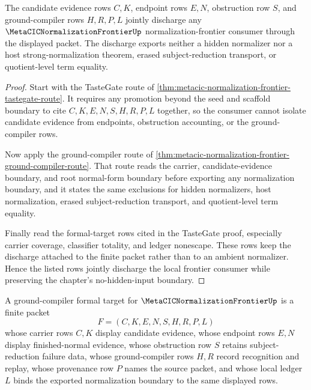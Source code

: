 \begin{theorem}
\label{thm:metacic-normalization-frontier-discharge-route}
The candidate evidence rows $C,K$, endpoint rows $E,N$, obstruction row $S$, and ground-compiler rows $H,R,P,L$ jointly discharge any $\MetaCICNormalizationFrontierUp$ normalization-frontier consumer through the displayed packet. The discharge exports neither a hidden normalizer nor a host strong-normalization theorem, erased subject-reduction transport, or quotient-level term equality.
\end{theorem}
\begin{proof}
Start with the TasteGate route of \autoref{thm:metacic-normalization-frontier-tastegate-route}. It requires any promotion beyond the seed and scaffold boundary to cite $C,K,E,N,S,H,R,P,L$ together, so the consumer cannot isolate candidate evidence from endpoints, obstruction accounting, or the ground-compiler rows.

Now apply the ground-compiler route of \autoref{thm:metacic-normalization-frontier-ground-compiler-route}. That route reads the carrier, candidate-evidence boundary, and root normal-form boundary before exporting any normalization boundary, and it states the same exclusions for hidden normalizers, host normalization, erased subject-reduction transport, and quotient-level term equality.

Finally read the formal-target rows cited in the TasteGate proof, especially carrier coverage, classifier totality, and ledger nonescape. These rows keep the discharge attached to the finite packet rather than to an ambient normalizer. Hence the listed rows jointly discharge the local frontier consumer while preserving the chapter's no-hidden-input boundary.
\end{proof}

\begin{definition}
\label{def:metacic-normalization-frontier-ground-compiler-formal-target}
A ground-compiler formal target for $\MetaCICNormalizationFrontierUp$ is a finite packet
$$
F=(C,K,E,N,S,H,R,P,L)
$$
whose carrier rows $C,K$ display candidate evidence, whose endpoint rows $E,N$ display finished-normal evidence, whose obstruction row $S$ retains subject-reduction failure data, whose ground-compiler rows $H,R$ record recognition and replay, whose provenance row $P$ names the source packet, and whose local ledger $L$ binds the exported normalization boundary to the same displayed rows.
\end{definition}

